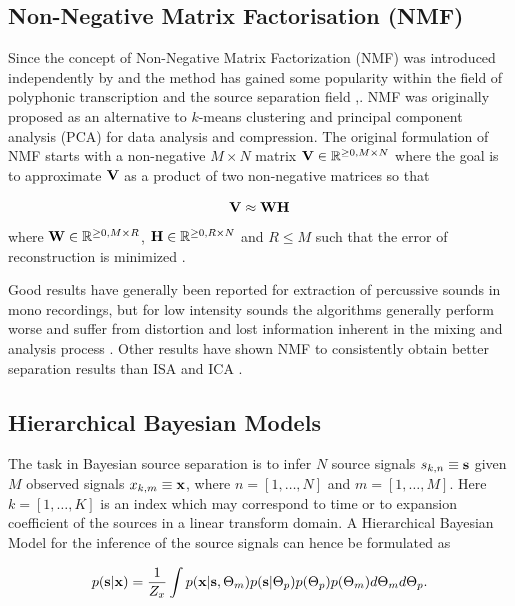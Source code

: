 \subsection{Non-Negative Matrix Factorisation (NMF)}
Since the concept of Non-Negative Matrix Factorization (NMF) was introduced independently by \cite{Paatero1997} and \cite{Lee1999} the method has gained some popularity within the field of polyphonic transcription and the source separation field \citep{Smaragdis2003},\citep{Smaragdis2004}. NMF was originally proposed as an alternative to $k$-means clustering and principal component analysis (PCA) for data analysis and compression.
The original formulation of NMF starts with a non-negative $M\times N$ matrix $\textrm{\textbf{V}} \in \mathbb{R}^{\geq 0,M\times N}$ where the goal is to approximate $\textrm{\textbf{V}}$ as a product of two non-negative matrices so that

\begin{equation}\label{eq:nmf1}
    \textrm{\textbf{V}} \approx \textrm{\textbf{W}}\textrm{\textbf{H}}
\end{equation}
where $\textrm{\textbf{W}} \in \mathbb{R}^{\geq 0,M\times R}$, $\textrm{\textbf{H}} \in \mathbb{R}^{\geq 0,R\times N}$ and $R \leq M$ such that the error of reconstruction is minimized \citep{Smaragdis2004}.

Good results have generally been reported for extraction of percussive sounds in mono recordings, but for low intensity sounds the algorithms generally perform worse and suffer from distortion and lost information inherent in the mixing and analysis process \citep{Smaragdis2004}. Other results have shown NMF to consistently obtain better separation results than ISA and ICA \citep{Virtanen2007}.

\subsection{Hierarchical Bayesian Models}
The task in Bayesian source separation is to infer $N$ source signals $s_{k,n} \equiv \textrm{\textbf{s}}$ given $M$ observed signals $x_{k,m} \equiv \textrm{\textbf{x}}$, where $n=[1,\ldots,N]$ and $m=[1,\ldots,M]$. Here $k=[1,\ldots,K]$ is an index which may correspond to time or to expansion coefficient of the sources in a linear transform domain. A Hierarchical Bayesian Model for the inference of the source signals can hence be formulated as

\begin{equation}\label{eq:hbm1}
    p(\textrm{\textbf{s}}|\textrm{\textbf{x}}) = \frac{1}{Z_x}\int p(\textrm{\textbf{x}}|\textrm{\textbf{s}},\Theta_m)p(\textrm{\textbf{s}}|\Theta_p)p(\Theta_p)p(\Theta_m)d\Theta_m d\Theta_p.
\end{equation}

